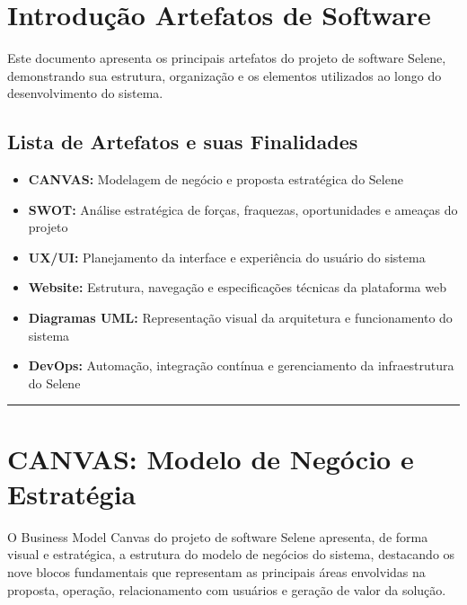 \documentclass[11pt,a4paper]{article}
\begin{document}
\pagestyle{fancy}

\tableofcontents
\newpage

\section*{Introdução Artefatos de Software}

\noindent Este documento apresenta os principais artefatos do projeto de software Selene, demonstrando sua estrutura, organização e os elementos utilizados ao longo do desenvolvimento do sistema.

\subsection*{Lista de Artefatos e suas Finalidades}

\begin{itemize}
    \item \textbf{CANVAS:} Modelagem de negócio e proposta estratégica do Selene
    \item \textbf{SWOT:} Análise estratégica de forças, fraquezas, oportunidades e ameaças do projeto
    \item \textbf{UX/UI:} Planejamento da interface e experiência do usuário do sistema
    \item \textbf{Website:} Estrutura, navegação e especificações técnicas da plataforma web
    \item \textbf{Diagramas UML:} Representação visual da arquitetura e funcionamento do sistema
    \item \textbf{DevOps:} Automação, integração contínua e gerenciamento da infraestrutura do Selene
\end{itemize}

\vspace{0.5cm}
\noindent\rule{\textwidth}{0.5pt}

\newpage

\section{CANVAS: Modelo de Negócio e Estratégia}

O Business Model Canvas do projeto de software Selene apresenta, de forma visual e estratégica, a estrutura do modelo de negócios do sistema, destacando os nove blocos fundamentais que representam as principais áreas envolvidas na proposta, operação, relacionamento com usuários e geração de valor da solução.
\end{document}
